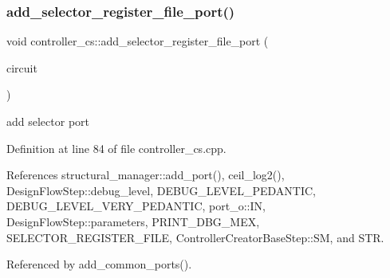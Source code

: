 \subsubsection{\texorpdfstring{add\+\_\+selector\+\_\+register\+\_\+file\+\_\+port()}{add\_selector\_register\_file\_port()}}
{\footnotesize\ttfamily void controller\+\_\+cs\+::add\+\_\+selector\+\_\+register\+\_\+file\+\_\+port (\begin{DoxyParamCaption}\item[{\hyperlink{structural__objects_8hpp_a8ea5f8cc50ab8f4c31e2751074ff60b2}{structural\+\_\+object\+Ref}}]{circuit }\end{DoxyParamCaption})\hspace{0.3cm}{\ttfamily [protected]}}

add selector port 

Definition at line 84 of file controller\+\_\+cs.\+cpp.



References structural\+\_\+manager\+::add\+\_\+port(), ceil\+\_\+log2(), Design\+Flow\+Step\+::debug\+\_\+level, D\+E\+B\+U\+G\+\_\+\+L\+E\+V\+E\+L\+\_\+\+P\+E\+D\+A\+N\+T\+IC, D\+E\+B\+U\+G\+\_\+\+L\+E\+V\+E\+L\+\_\+\+V\+E\+R\+Y\+\_\+\+P\+E\+D\+A\+N\+T\+IC, port\+\_\+o\+::\+IN, Design\+Flow\+Step\+::parameters, P\+R\+I\+N\+T\+\_\+\+D\+B\+G\+\_\+\+M\+EX, S\+E\+L\+E\+C\+T\+O\+R\+\_\+\+R\+E\+G\+I\+S\+T\+E\+R\+\_\+\+F\+I\+LE, Controller\+Creator\+Base\+Step\+::\+SM, and S\+TR.



Referenced by add\+\_\+common\+\_\+ports().

